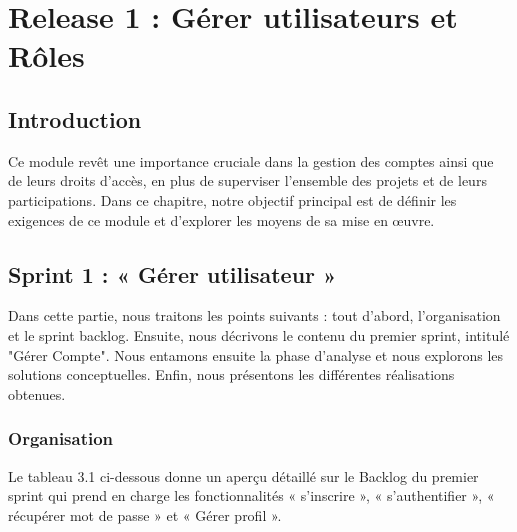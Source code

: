 \chapter{Release 1 : Gérer utilisateurs et Rôles}
\label{chap_sprint1}
\section*{Introduction}
\label{sec_introduction}
Ce module revêt une importance cruciale dans la gestion des comptes ainsi
que de leurs droits d'accès, en plus de superviser l'ensemble des projets et de leurs
participations. Dans ce chapitre, notre objectif principal est de définir les exigences de
ce module et d'explorer les moyens de sa mise en œuvre.


\section{Sprint 1 : « Gérer utilisateur »}
 Dans cette partie, nous traitons les points suivants : tout d'abord, l'organisation et le sprint backlog. Ensuite, nous décrivons le contenu du premier sprint, intitulé "Gérer Compte". Nous entamons ensuite la phase d'analyse et nous explorons les solutions conceptuelles. Enfin, nous présentons les différentes réalisations obtenues.
\subsection{Organisation}
Le tableau 3.1 ci-dessous donne un aperçu détaillé sur le Backlog du premier sprint qui prend en
charge les fonctionnalités « s'inscrire », « s'authentifier », « récupérer mot de passe » et « Gérer profil ».

